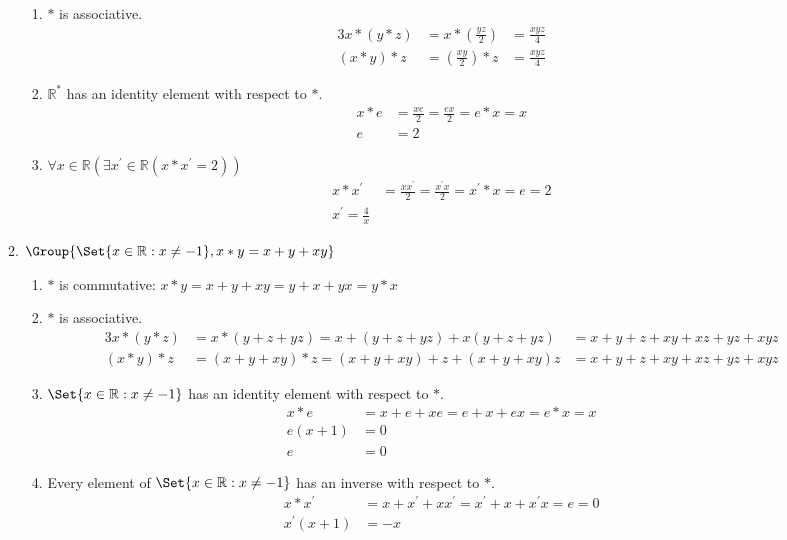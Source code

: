 \begin{enumerate}[label={\Alph*.},font={\bfseries}]
\begin{enumerate}[label={\arabic*},font={\bfseries}]
\begin{enumerate}[label={(\roman*)}]
    \item $*$ is associative.
      \begin{alignat*}{3}
        x*(y*z) &= x*(\frac{yz}{2}) &= \frac{xyz}{4} \\
        (x*y)*z &= (\frac{xy}{2})*z &= \frac{xyz}{4}
      \end{alignat*}
    \item $\mathbb{R}^*$ has an identity element with respect to $*$.
      \begin{align*}
        x*e &= \frac{xe}{2} = \frac{ex}{2}=e*x = x \\
        e &= 2
      \end{align*}
    \item $\forall x\in\mathbb{R}(\exists x^\prime\in\mathbb{R}(x*x^\prime=2))$
      \begin{align*}
        x*x^\prime &= \frac{xx^\prime}{2} = \frac{x^{\prime}x}{2} = x^{\prime}*x = e = 2 \\
        x^\prime = \frac{4}{x}
      \end{align*}
    \end{enumerate}
  \item $\Group{\Set{x\in\mathbb{R} : x \neq -1}, x*y=x+y+xy}$
    \begin{enumerate}[label={(\roman*)}]
    \item $*$ is commutative: $x*y=x+y+xy = y+x+yx=y*x$
    \item $*$ is associative.
      \begin{alignat*}{3}
        x*(y*z) &= x*(y+z+yz) = x+(y+z+yz)+x(y+z+yz) &= x+y+z+xy+xz+yz+xyz \\
        (x*y)*z &= (x+y+xy)*z = (x+y+xy)+z+(x+y+xy)z &= x+y+z+xy+xz+yz+xyz
      \end{alignat*}
    \item $\Set{x\in\mathbb{R} : x \neq -1}$ has an identity element with respect to $*$.
      \begin{align*}
        x*e &= x+e+xe = e+x+ex = e*x = x \\
        e(x+1) &= 0 \\
        e &= 0
      \end{align*}
    \item Every element of $\Set{x\in\mathbb{R} : x \neq -1}$ has an inverse with respect to $*$.
      \begin{align*}
        x*x^\prime &= x+x^\prime+xx^\prime=x^\prime+x+x^{\prime}x = e = 0 \\
        x^{\prime}(x+1) &= -x \\

\end{align*}
\end{enumerate}
\end{enumerate}
\end{enumerate}
